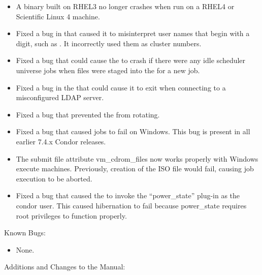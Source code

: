 \begin{itemize}
\item A  binary built on RHEL3 no longer crashes
when run on a RHEL4 or Scientific Linux 4 machine.

\item Fixed a bug in  that caused it to misinterpret user names
that begin with a digit, such as .
It incorrectly used them as cluster numbers. 

\item Fixed a bug that could cause the  to crash if there
were any idle scheduler universe jobs when files were staged into the
 for a new job.

\item Fixed a bug in the  that could cause it to exit
when connecting to a misconfigured LDAP server.

\item Fixed a bug that prevented the  from rotating.

\item Fixed a bug that caused  jobs to fail on Windows. This bug is 
present in all earlier 7.4.x Condor releases.

\item The submit file attribute vm\_cdrom\_files now works properly
with Windows execute machines. Previously, creation of the ISO file
would fail, causing job execution to be aborted.

\item Fixed a bug that caused the  to invoke the
  ``power\_state'' plug-in as the condor user.  This caused
  hibernation to fail because power\_state requires root privileges
  to function properly.

\end{itemize}

\noindent Known Bugs:

\begin{itemize}

\item None.

\end{itemize}

\noindent Additions and Changes to the Manual:


